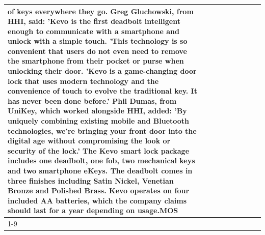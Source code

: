 \begin{table}[H]
\begin{tabular}{lllrlllll}
of keys everywhere they go. Greg Gluchowski, from HHI, said: 'Kevo is the first deadbolt intelligent enough to communicate with a smartphone and unlock with a simple touch. 'This technology is so convenient that users do not even need to remove the smartphone from their pocket or purse when unlocking their door. 'Kevo is a game-changing door lock that uses modern technology and the convenience of touch to evolve the traditional key. It has never been done before.' Phil Dumas, from UniKey, which worked alongside HHI, added: 'By uniquely combining existing mobile and Bluetooth technologies, we’re bringing your front door into the digital age without compromising the look or security of the lock.' The Kevo smart lock package includes one deadbolt, one fob, two mechanical keys and two smartphone eKeys. The deadbolt comes in three finishes including Satin Nickel, Venetian Bronze and Polished Brass. Kevo operates on four included AA batteries, which the company claims should last for a year depending on usage.MOS \\
\cline{1-9}

\end{tabular}
\end{table}
